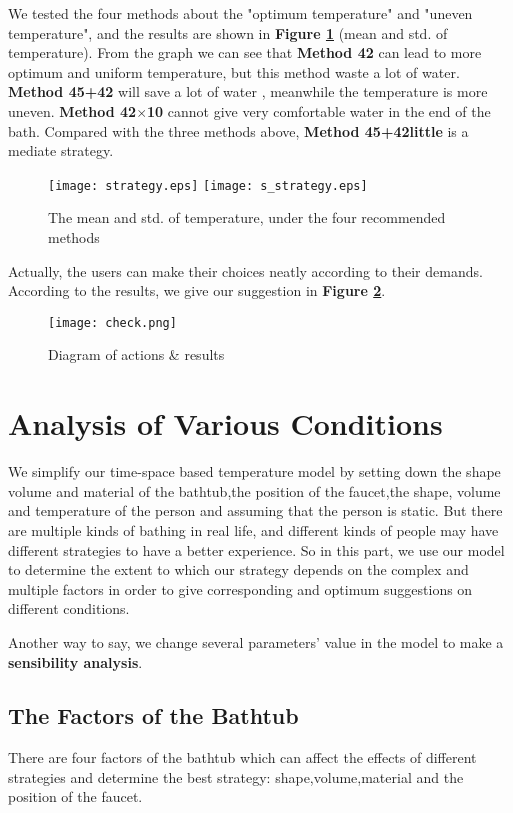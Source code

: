\documentclass[12pt]{article}
\begin{document}
We tested the four methods about the "optimum temperature" and "uneven temperature", and the results
are shown in \textbf{Figure \ref{strategy}} (mean and std. of temperature). From the graph we can
see that \textbf{Method 42} can lead to more optimum and uniform temperature, but this method waste
a lot of water. \textbf{Method 45+42} will save a lot of water , meanwhile the temperature is more
uneven. \textbf{Method 42$\times$10} cannot give very comfortable water in the end of the bath.
Compared with the three methods above, \textbf{Method 45+42little} is a mediate strategy.
\begin{figure}[!htbp]
\small
\centering
\texttt{[image: strategy.eps]}
\texttt{[image: s\_strategy.eps]}
\caption{The mean and std. of temperature, under the four recommended methods}\label{strategy}
\end{figure}

Actually, the users can make their choices neatly according to their demands. According to the
results, we give our suggestion in \textbf{Figure \ref{check}}.
\begin{figure}[!htbp]
\small
\centering
\texttt{[image: check.png]}
\caption{Diagram of actions \& results}\label{check}
\end{figure}


\section{Analysis of Various Conditions}\label{condition}
We simplify our time-space based temperature model by setting down the shape volume and material of
the bathtub,the position of the faucet,the shape, volume and temperature of the person and assuming
that the person is static. But there are multiple kinds of bathing in real life, and different kinds
of people may have different strategies to have a better experience. So in this part, we use our
model to determine the extent to which our strategy depends on the complex and multiple factors in
order to give corresponding and optimum suggestions on different conditions.

Another way to say, we change several parameters' value in the model to make a \textbf{sensibility
analysis}.

\subsection{The Factors of the Bathtub}
There are four factors of the bathtub which can affect the effects of different strategies and
determine the best strategy: shape,volume,material and the position of the faucet.
\end{document}
